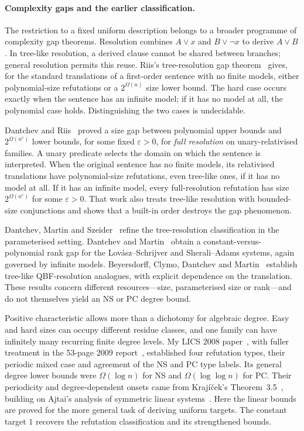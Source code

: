 \paragraph{Complexity gaps and the earlier classification.}
The restriction to a fixed uniform description belongs to a broader
programme of complexity gap theorems. Resolution combines
$A\lor x$ and $B\lor\neg x$ to derive $A\lor B$. In tree-like
resolution, a derived clause cannot be shared between branches;
general resolution permits this reuse. Riis's tree-resolution gap
theorem~\cite{RiisTree} gives, for the standard translations of a
first-order sentence with no finite models, either polynomial-size
refutations or a $2^{\Omega(n)}$ size lower bound. The hard case occurs
exactly when the sentence has an infinite model; if it has no model
at all, the polynomial case holds. Distinguishing the two cases is
undecidable.

Dantchev and Riis~\cite{DantchevRiis} proved a size gap between
polynomial upper bounds and $2^{\Omega(n^\varepsilon)}$ lower bounds,
for some fixed $\varepsilon>0$, for \emph{full resolution} on
unary-relativised families. A unary predicate selects the domain on which the sentence
is interpreted. When the original sentence has no finite models, its
relativised translations have polynomial-size refutations, even
tree-like ones, if it has no model at all. If it has an infinite model,
every full-resolution refutation has size
$2^{\Omega(n^\varepsilon)}$ for some $\varepsilon>0$. That work also
treats tree-like resolution with bounded-size conjunctions and shows
that a built-in order destroys the gap phenomenon.

Dantchev, Martin and Szeider~\cite{DMS} refine the tree-resolution
classification in the parameterised setting. Dantchev and
Martin~\cite{DMRank} obtain a constant-versus-polynomial rank gap for
the Lov\'asz--Schrijver and Sherali--Adams systems, again governed by
infinite models. Beyersdorff, Clymo, Dantchev and Martin~\cite{QBFGap}
establish tree-like QBF-resolution analogues, with explicit dependence
on the translation. These results concern different resources---size,
parameterised size or rank---and do not themselves yield an NS or PC
degree bound.

Positive characteristic allows more than a dichotomy for algebraic
degree. Easy and hard sizes can occupy different residue classes, and
one family can have infinitely many recurring finite degree levels.
My LICS 2008 paper~\cite[Theorems~1 and~10]{Riis}, with fuller treatment
in the 53-page 2009 report~\cite{RiisLong}, established four refutation types,
their periodic mixed case and agreement of the NS and PC type labels.
Its general degree lower bounds were $\Omega(\log n)$ for NS and
$\Omega(\log\log n)$ for PC. Their periodicity and degree-dependent
onsets came from Kraj\'i\v cek's Theorem~3.5~\cite{Krajicek}, building
on Ajtai's analysis of symmetric linear systems~\cite{Ajtai}.
Here the linear bounds are proved for
the more general task of deriving uniform targets. The constant
target $1$ recovers the refutation classification and its strengthened
bounds.

